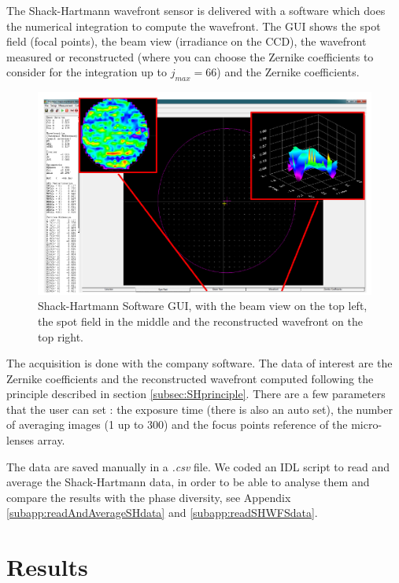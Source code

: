 The Shack-Hartmann wavefront sensor is delivered with a software which does the numerical integration to compute
the wavefront. The GUI shows the spot field (focal points), the beam view (irradiance on the
CCD), the wavefront measured or reconstructed (where you can choose the Zernike coefficients
to consider for the integration up to $j_{max}=66$) and the Zernike coefficients.

\begin{figure}
\begin{center}
\includegraphics[width=\textwidth,angle=0]{Figures/SHWFS_GUI}
\decoRule
\caption{Shack-Hartmann Software GUI, with the  beam view on the top left, the spot field in the middle and the reconstructed wavefront on the top right.}
\label{fig:}
\end{center}
\end{figure}

The acquisition is done with the company software. The data of interest are the Zernike coefficients and the reconstructed wavefront computed following the principle described in section \ref{subsec:SHprinciple}. There are a few parameters that the user can set : the exposure time (there is also an auto set), the number of averaging images (1 up to 300) and the focus points reference of the micro-lenses array. 

The data are saved manually in a \textit{.csv} file. We coded an IDL script to read and average the Shack-Hartmann data, in order to be able to analyse them and compare the results with the phase diversity, see Appendix \ref{subapp:readAndAverageSHdata} and \ref{subapp:readSHWFSdata}. 

\section{Results}
\label{sec:Results}

